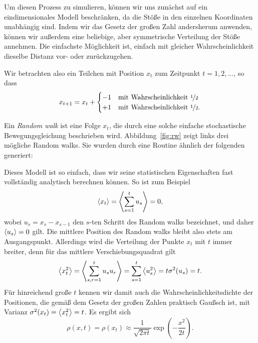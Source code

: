 Um diesen Prozess zu simulieren, können wir uns zunächst auf ein
eindimensionales Modell beschränken, da die Stöße in den
einzelnen Koordinaten unabhängig sind. Indem wir das Gesetz der großen Zahl
andersherum anwenden, können wir außerdem eine beliebige, aber
symmetrische Verteilung der Stöße annehmen. Die einfachste Möglichkeit
ist, einfach mit gleicher Wahrscheinlichkeit dieselbe Distanz vor-
oder zurückzugehen.

Wir betrachten also ein Teilchen mit Position $x_t$ zum Zeitpunkt
$t=1, 2,\ldots$, so dass
\begin{equation}
  \label{eq:rw}
  x_{t+1} = x_t +
  \begin{cases}
    -1 & \text{mit Wahrscheinlichkeit \nicefrac{1}{2}}\\
    +1 & \text{mit Wahrscheinlichkeit \nicefrac{1}{2}}.
  \end{cases}
\end{equation}

Ein \emph{Random walk} ist eine Folge $x_t$, die durch eine solche
einfache stochastische Bewegungsgleichung beschrieben wird.
Abbildung~\ref{fig:rw} zeigt links drei mögliche Random
walks. Sie wurden durch eine Routine ähnlich der folgenden generiert: 


Dieses Modell ist so einfach, dass wir seine statistischen
Eigenschaften fast vollständig analytisch berechnen können. So ist zum
Beispiel
\begin{equation}
  \left\langle{x_t}\right\rangle = \left\langle{\sum_{s=1}^{t} u_s}\right\rangle = 0, 
\end{equation}
wobei $u_{s} = x_{s} - x_{s-1}$ den $s$-ten Schritt des Random walks
bezeichnet, und daher $\left\langle{u_s}\right\rangle = 0$ gilt. Die mittlere Position des
Random walks bleibt also stets am Ausgangspunkt. Allerdings wird die
Verteilung der Punkte $x_t$ mit $t$ immer breiter, denn für das
mittlere Verschiebungsquadrat gilt
\begin{equation}
  \label{eq:sigmarw}
  \left\langle{x_t^2}\right\rangle =
  \left\langle{\sum_{s,r=1}^{t} u_su_r}\right\rangle = \sum_{s=1}^{t}\left\langle{u_s^2}\right\rangle
  = t\sigma^2(u_s) = t.
\end{equation}
Für hinreichend große $t$ kennen wir damit auch die
Wahrscheinlichkeitsdichte der Positionen, die gemäß dem Gesetz der
großen Zahlen praktisch Gaußsch ist, mit Varianz $\sigma^2(x_t) =
\left\langle{x_t^2}\right\rangle = t$. Es ergibt sich
\begin{equation}
  \rho(x, t) = \rho(x_t) \approx \frac{1}{\sqrt{2\pi t}}
  \exp\left(-\frac{x^2}{2t}\right).
\end{equation}

